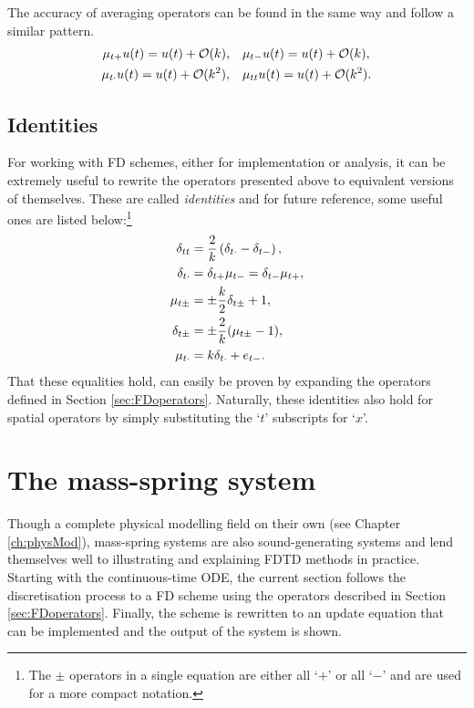 The accuracy of averaging operators can be found in the same way and follow a similar pattern. 
\begin{equation}
    \begin{aligned}
    \mu_{t+} u(t) = u(t) + \mathcal{O}(k),\quad &\mu_{t-} u(t)= u(t) + \mathcal{O}(k),\\
    \mu_{t\cdot} u(t)= u(t) + \mathcal{O}(k^2), \quad &\mu_{tt} u(t)= u(t) + \mathcal{O}(k^2).
    \end{aligned}
\end{equation}

\subsection{Identities}
For working with FD schemes, either for implementation or analysis, it can be extremely useful to rewrite the operators presented above to equivalent versions of themselves. These are called \textit{identities} and for future reference, some useful ones are listed below:\footnote{The $\pm$ operators in a single equation are either all `$+$' or all `$-$' and are used for a more compact notation.}
\begin{subequations}
    \begin{align}
        \delta_{tt} &= \frac{2}{k}\left(\delta_{t\cdot}- \delta_{t-}\right),\label{eq:identity1}\\
        \delta_{t\cdot} &= \delta_{t+}\mu_{t-} = \delta_{t-}\mu_{t+}\label{eq:identity2},\\
        \mu_{t\pm} &= \pm\frac{k}{2}\delta_{t\pm} + 1\label{eq:identity3},\\
        \delta_{t\pm} &= \pm\frac{2}{k}(\mu_{t\pm} - 1),\label{eq:identityLip}\\
        \mu_{t\cdot} &= k\delta_{t\cdot} + e_{t-}.\label{eq:identity4}
    \end{align}
\end{subequations}
That these equalities hold, can easily be proven by expanding the operators defined in Section \ref{sec:FDoperators}. Naturally, these identities also hold for spatial operators by simply substituting the `$t$' subscripts for `$x$'. 

\section{%
The mass-spring system}\label{sec:massSpringSystem}
Though a complete physical modelling field on their own (see Chapter \ref{ch:physMod}), mass-spring systems are also sound-generating systems and lend themselves well to illustrating and explaining FDTD methods in practice. Starting with the continuous-time ODE, the current section follows the discretisation process to a FD scheme using the operators described in Section \ref{sec:FDoperators}. Finally, the scheme is rewritten to an update equation that can be implemented and the output of the system is shown. 

